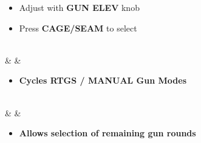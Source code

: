 \documentclass[fontInter]{TechCheck}
\begin{document}
\begin{listlongtable}
\begin{minipage}[t]{\linewidth}
\begin{itemize}
\begin{itemize}
					\item Adjust with \textbf{GUN ELEV} knob
					\item Press \textbf{CAGE/SEAM} to select
				\end{itemize}
			\end{itemize}
		\end{minipage} \\
		\midrule
		\textbf{\textbullet} &   \hfill\null {} &
		\begin{minipage}[t]{\linewidth}
			\vspace{-7pt}
			\begin{itemize}
				\item \textbf{Cycles RTGS / MANUAL Gun Modes}
			\end{itemize}
		\end{minipage} \\
		\midrule
		\textbf{\textbullet} &  &
		\begin{minipage}[t]{\linewidth}
			\vspace{-7pt}
			\begin{itemize}
				\item \textbf{Allows selection of remaining gun rounds}
			\end{itemize}
		\end{minipage} \\
	\end{listlongtable}

	\clearpage
\end{document}
